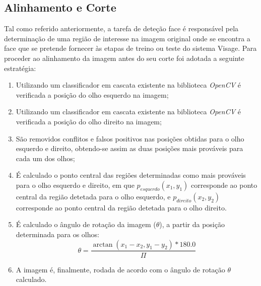 \subsection{Alinhamento e Corte} \label{alinhamentoEcorte}
Tal como referido anteriormente, a tarefa de deteção face é responsável pela determinação de uma região de interesse na imagem original onde se encontra a face que se pretende fornecer às etapas de treino ou teste do sistema Visage.
Para proceder ao alinhamento da imagem antes do seu corte foi adotada a seguinte estratégia:
\begin{enumerate}
\item Utilizando um classificador em cascata existente na biblioteca \textit{OpenCV} é verificada a posição do olho esquerdo na imagem;
\item Utilizando um classificador em cascata existente na biblioteca \textit{OpenCV} é verificada a posição do olho direito na imagem;
\item São removidos conflitos e falsos positivos nas posições obtidas para o olho esquerdo e direito, obtendo-se assim as duas posições mais prováveis para cada um dos olhos;
\item É calculado o ponto central das regiões determinadas como mais prováveis para o olho esquerdo e direito, em que $p_{esquerdo}(x_1,y_1)$ corresponde ao ponto central da região detetada para o olho esquerdo, e  $p_{direito}(x_2,y_2)$ corresponde ao ponto central da região detetada para o olho direito.
\item É calculado o ângulo de rotação da imagem ($\theta$), a partir da posição determinada para os olhos:
\begin{equation}
\theta = \frac{\arctan(x_1 - x_2, y_1 - y_2) * 180.0}{\Pi}
\end{equation}
\item A imagem é, finalmente, rodada de acordo com o ângulo de rotação $\theta$ calculado.
\end{enumerate}

